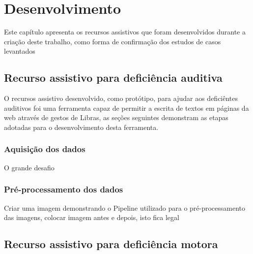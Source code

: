 \newpage
\chapter{Desenvolvimento}
\label{ch:desenvolvimento}

Este capítulo apresenta os recursos assistivos que foram desenvolvidos durante a criação deste trabalho, como forma de confirmação dos estudos de casos levantados 


\section{Recurso assistivo para deficiência auditiva}

O recursos assistivo desenvolvido, como protótipo, para ajudar aos deficiêntes auditivos foi uma ferramenta capaz de permitir a escrita de textos em páginas da web através de gestos de Libras, as seções seguintes demonstram as etapas adotadas para o desenvolvimento desta ferramenta.

\subsection{Aquisição dos dados}

O grande desafio 

\subsection{Pré-processamento dos dados} 



\par Criar uma imagem demonstrando o Pipeline utilizado para o pré-processamento das imagens, colocar imagem antes e depois, isto fica legal

\section{Recurso assistivo para deficiência motora}


